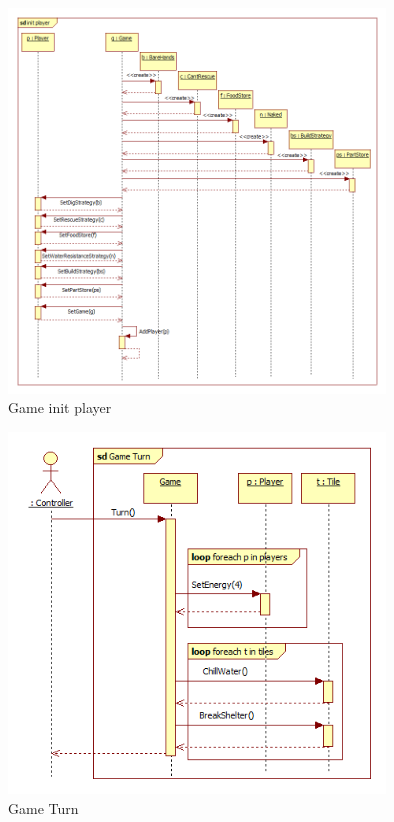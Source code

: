 \begin{figure}[H]
        \begin{center}
                \includegraphics[width=10cm]{chapters/chapter07/seqdiag/Game_init_player.png}
                \caption{Game init player}
                \label{Game init player}
        \end{center}
\end{figure}
\begin{figure}[H]
        \begin{center}
                \includegraphics[width=10cm]{chapters/chapter07/seqdiag/Game_Turn.png}
                \caption{Game Turn}
                \label{Game Turn}
        \end{center}
\end{figure}
